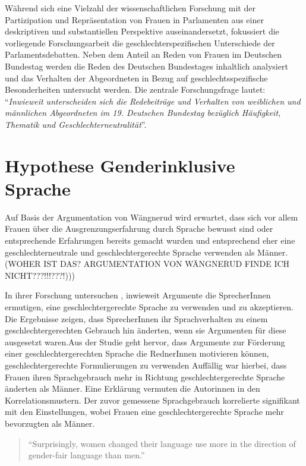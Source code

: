 \documentclass[12pt, 
    twoside=false, 
    bibliography=totoc, 
    numbers=endperiod, 
    headings=normal, 
    toc=chapterentrydotfill
    ]{scrbook}
\begin{document}
Während sich eine Vielzahl der wissenschaftlichen Forschung mit der Partizipation und Repräsentation von Frauen in Parlamenten aus einer deskriptiven und substantiellen Perspektive auseinandersetzt, fokussiert die vorliegende Forschungsarbeit die geschlechterspezifischen Unterschiede der Parlamentsdebatten.
Neben dem Anteil an Reden von Frauen im Deutschen Bundestag werden die Reden des Deutschen Bundestages inhaltlich analysiert und das Verhalten der Abgeordneten in Bezug auf geschlechtsspezifische Besonderheiten untersucht werden. Die zentrale Forschungsfrage lautet: \enquote{\emph{Inwieweit unterscheiden sich die Redebeiträge und Verhalten von weiblichen und männlichen Abgeordneten im 19. Deutschen Bundestag bezüglich Häufigkeit, Thematik und Geschlechterneutralität}}.





\section{Hypothese Genderinklusive Sprache}

Auf Basis der Argumentation von Wängnerud \parencites*{wangnerud_2000}{wangnerud_2009} wird erwartet, dass sich vor allem Frauen über die Ausgrenzungserfahrung durch Sprache bewusst sind oder entsprechende Erfahrungen bereits gemacht wurden und entsprechend eher eine geschlechterneutrale und geschlechtergerechte Sprache verwenden als Männer.  (WOHER IST DAS? ARGUMENTATION VON WÄNGNERUD FINDE ICH NICHT???!!!???!))) 

In ihrer Forschung untersuchen \textcite{koeser_2014}, inwieweit Argumente die SprecherInnen ermutigen, eine geschlechtergerechte Sprache zu verwenden und zu akzeptieren. Die Ergebnisse zeigen, dass SprecherInnen ihr Sprachverhalten zu einem geschlechtergerechten Gebrauch hin änderten, wenn sie Argumenten für diese ausgesetzt waren.Aus der Studie geht hervor, dass Argumente zur Förderung einer geschlechtergerechten Sprache die RednerInnen motivieren können, geschlechtergerechte Formulierungen zu verwenden \parencite[548]{koeser_2014} Auffällig war hierbei, dass Frauen ihren Sprachgebrauch mehr in Richtung geschlechtergerechte Sprache änderten als Männer. Eine Erklärung vermuten die Autorinnen in den Korrelationsmustern. Der zuvor gemessene Sprachgebrauch korrelierte signifikant mit den Einstellungen, wobei Frauen eine geschlechtergerechte Sprache mehr bevorzugten als Männer\parencite[555]{koeser_2014}.

\begin{quote}
    \enquote {Surprisingly, women changed their
language use more in the direction of gender-fair language than men.} \parencite[555]{koeser_2014}
\end{quote}
\end{document}
